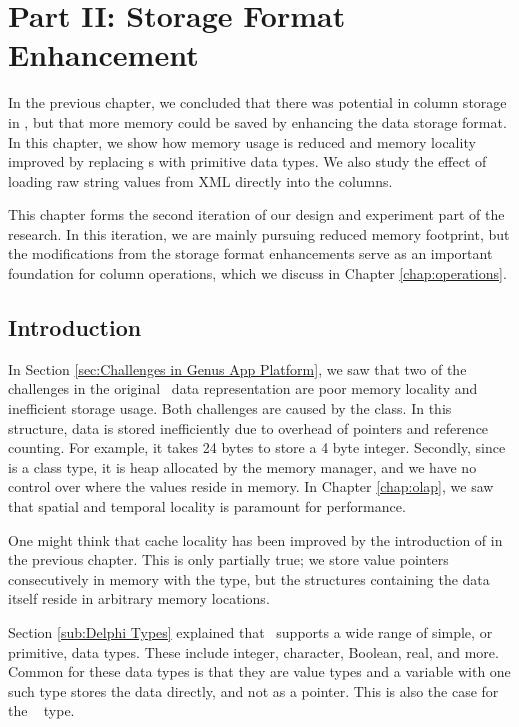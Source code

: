\chapter{Part II: Storage Format Enhancement}
\label{chap:storage-format}
In the previous chapter, we concluded that there was potential in column storage in \gap, but that more memory could be saved by enhancing the data storage format. In this chapter, we show how memory usage is reduced and memory locality improved by replacing s with primitive data types. We also study the effect of loading raw string values from XML directly into the columns.

This chapter forms the second iteration of our design and experiment part of the research. In this iteration, we are mainly pursuing reduced memory footprint, but the modifications from the storage format enhancements serve as an important foundation for column operations, which we discuss in Chapter \ref{chap:operations}.  
\clearpage

\section{Introduction}
\label{sec:Introduction}
In Section \ref{sec:Challenges in Genus App Platform}, we saw that two of the challenges in the original \gap~data representation are poor memory locality and inefficient storage usage. Both challenges are caused by the  class. In this structure, data is stored inefficiently due to overhead of pointers and reference counting. For example, it takes 24 bytes to store a 4 byte integer. Secondly, since  is a class type, it is heap allocated by the memory manager, and we have no control over where the values reside in memory. In Chapter \ref{chap:olap}, we saw that spatial and temporal locality is paramount for performance.

One might think that cache locality has been improved by the introduction of  in the previous chapter. This is only partially true; we store value pointers consecutively in memory with the  type, but the structures containing the data itself reside in arbitrary memory locations.

Section \ref{sub:Delphi Types} explained that \delphi~supports a wide range of simple, or primitive, data types. These include integer, character, Boolean, real, and more. Common for these data types is that they are value types and a variable with one such type stores the data directly, and not as a pointer. This is also the case for the \delphi~ type.

